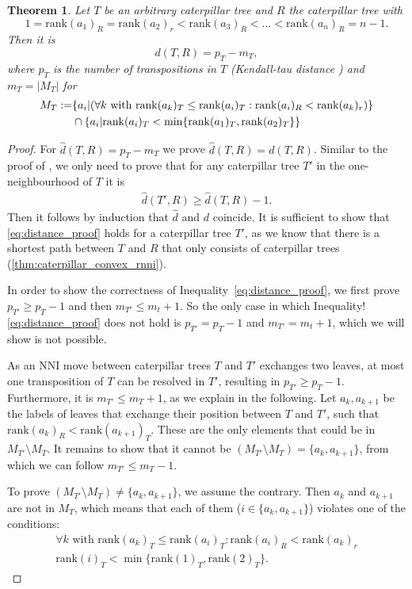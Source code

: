 \documentclass[11pt]{amsart}
\newtheorem{theorem}{Theorem}
\newcommand{\tocite}{ {\color{red}\fbox{CITATION}} }
\newcommand{\rank}{\mathrm{rank}}
\newcommand{\nni}{\mathrm{NNI}}
\begin{document}
\begin{theorem}
	Let $T$ be an arbitrary caterpillar tree and $R$ the caterpillar tree with
	\[1 = \rank(a_1)_R = \rank(a_2)_r < \rank(a_3)_R < \ldots < \rank(a_n)_R = n-1.\]
	Then it is
	\[d(T,R) = p_T - m_T,\]
	where $p_T$ is the number of transpositions in $T$ (Kendall-tau distance \tocite) and $m_T = |M_T|$ for
	\begin{align*}
		M_T := &\{a_i| (\forall k \textnormal{ with } \rank(a_k)_T \leq \rank(a_i)_T: \rank(a_i)_R < \rank(a_k)_r)\} \\
		& \cap \{a_i | \rank(a_i)_T < \min\{\rank(a_1)_T, \rank(a_2)_T\}\}
	\end{align*}
	\label{thm:caterpillar_distance_formula}
\end{theorem}

\begin{proof}
	For $\hat d(T,R) = p_T - m_T$ we prove $\hat d(T,R) = d(T,R)$.
	Similar to the proof of \autocite[Theorem 1]{Collienne2020-iu}, we only need to prove that for any caterpillar tree $T'$ in the one-neighbourhood of $T$ it is
	\begin{align}
		\hat d(T',R) \geq \hat d(T,R) - 1.
		\label{eq:distance_proof}
	\end{align}
	Then it follows by induction that $\hat d$ and $d$ coincide.
	It is sufficient to show that \autoref{eq:distance_proof} holds for a caterpillar tree $T'$, as we know that there is a shortest path between $T$ and $R$ that only consists of caterpillar trees (\autoref{thm:caterpillar_convex_rnni}).

	In order to show the correctness of Inequality~\ref{eq:distance_proof}, we first prove $p_{T'} \geq p_T - 1$ and then $m_{T'} \leq m_t + 1$.
	So the only case in which Inequality!\ref{eq:distance_proof} does not hold is $p_{T'} = p_T - 1$ and $m_{T'} = m_t + 1$, which we will show is not possible.

	As an $\nni$ move between caterpillar trees $T$ and $T'$ exchanges two leaves, at most one transposition of $T$ can be resolved in $T'$, resulting in $p_{T'} \geq p_T - 1$.
	Furthermore, it is $m_{T'} \leq m_T + 1$, as we explain in the following.
	Let $a_k, a_{k+1}$ be the labels of leaves that exchange their position between $T$ and $T'$, such that $\rank(a_k)_R < \rank(a_{k+1})_T$.
	These are the only elements that could be in $M_{T'} \setminus M_T$.
	It remains to show that it cannot be $(M_{T'} \setminus M_T) = \{a_k, a_{k+1}\}$, from which we can follow $m_{T'} \leq m_T - 1$.

	To prove $(M_{T'} \setminus M_T) \neq \{a_k, a_{k+1}\}$, we assume the contrary.
	Then $a_k$ and $a_{k+1}$ are not in $M_T$, which means that each of them ($i \in \{a_k,a_{k+1}\}$) violates one of the conditions:
	\begin{align}
		\forall k \text{ with } \rank(a_k)_T \leq \rank(a_i)_T: \rank(a_i)_R < \rank(a_k)_r \label{condition1}\\
		\rank(i)_T < \min\{\rank(1)_T, \rank(2)_T\}.
		\label{condition2}
	\end{align}


\end{proof}
\end{document}
